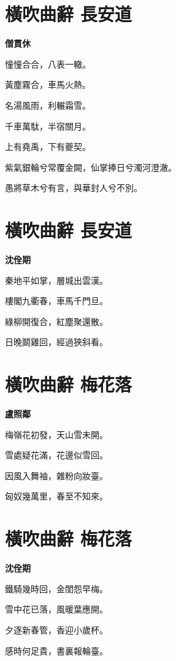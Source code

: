 \documentclass[12pt,a4paper]{ctexbook}
\begin{document}
\section{橫吹曲辭 長安道}
\textbf{僧貫休}\par\vspace{0.5em}
憧憧合合，八表一轍。\par
黃塵霧合，車馬火熱。\par
名湯風雨，利輾霜雪。\par
千車萬駄，半宿關月。\par
上有堯禹，下有夔契。\par
紫氣銀輪兮常覆金闕，仙掌捧日兮濁河澄澈。\par
愚將草木兮有言，與華封人兮不別。\par

\section{橫吹曲辭 長安道}
\textbf{沈佺期}\par\vspace{0.5em}
秦地平如掌，層城出雲漢。\par
樓閣九衢春，車馬千門旦。\par
綠柳開復合，紅塵聚還散。\par
日晚鬬雞回，經過狹斜看。\par

\section{橫吹曲辭 梅花落}
\textbf{盧照鄰}\par\vspace{0.5em}
梅嶺花初發，天山雪未開。\par
雪處疑花滿，花邊似雪回。\par
因風入舞袖，雜粉向妝臺。\par
匈奴幾萬里，春至不知來。\par

\section{橫吹曲辭 梅花落}
\textbf{沈佺期}\par\vspace{0.5em}
鐵騎幾時回，金閨怨早梅。\par
雪中花已落，風暖葉應開。\par
夕逐新春管，香迎小歲杯。\par
感時何足貴，書裏報輪臺。\par
\end{document}

